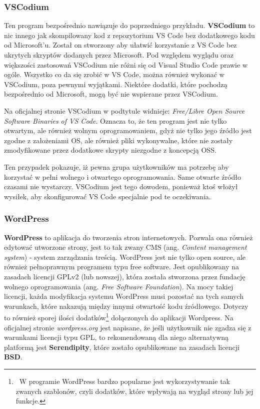 \documentclass{article}
\begin{document}
\subsubsection{VSCodium}

\hspace{4mm} Ten program bezpośrednio nawiązuje do poprzedniego przykładu. \textbf{VSCodium} to nic innego jak skompilowany kod z repozytorium VS Code bez dodatkowego kodu od Microsoft'u. Został on stworzony aby ułatwić korzystanie z VS Code bez ukrytych skryptów dodanych przez Microsoft. Pod względem wyglądu oraz większości zastosowań VSCodium nie różni się od Visual Studio Code prawie w ogóle. Wszystko co da się zrobić w VS Code, można również wykonać w VSCodium, poza pewnymi wyjątkami. Niektóre dodatki, które pochodzą bezpośrednio od Microsoft, mogą być nie wspierane przez VSCodium\cite{vscodium.article}. 

Na oficjalnej stronie VSCodium w podtytule widnieje: \emph{Free/Libre Open Source Software Binaries of VS Code}. Oznacza to, że ten program jest nie tylko otwartym, ale również wolnym oprogramowaniem, gdyż nie tylko jego źródło jest zgodne z założeniami OS, ale również pliki wykonywalne, które nie zostały zmodyfikowane przez dodatkowe skrypty niezgodne z koncepcją OSS\cite{vscodium.website}.

Ten przypadek pokazuje, iż pewna grupa użytkowników ma potrzebę aby korzystać w pełni wolnego i otwartego oprogramowania. Same otwarte źródło czasami nie wystarczy. VSCodium jest tego dowodem, ponieważ ktoś włożył wysiłek, aby skonfigurować VS Code specjalnie pod te oczekiwania.

\subsubsection{WordPress}

\hspace{4mm} \textbf{WordPress} to aplikacja do tworzenia stron internetowych. Pozwala ona również edytować utworzone strony, jest to tak zwany CMS (ang. \emph{Content management system}) - system zarządzania treścią. WordPress jest nie tylko open source, ale również pełnoprawnym programem typu free software. Jest opublikowany na zasadach licencji GPLv2 (lub nowszej), która została stworzona przez fundację wolnego oprogramowania (ang. \emph{Free Software Foundation})\cite{wordpress.license}. Na mocy takiej licencji, każda modyfikacja systemu WordPress musi pozostać na tych samych warunkach, które nakazują między innymi otwartość kodu źródłowego. Dotyczy to również sporej ilości dodatków\footnote{\, W programie WordPress bardzo popularne jest wykorzystywanie tak zwanych szablonów, czyli dodatków, które wpływają na wygląd strony lub jej funkcje.} dołączonych do aplikacji Wordpress. Na oficjalnej stronie \emph{wordpress.org} jest napisane, że jeśli użytkownik nie zgadza się z warunkami licencji typu GPL, to rekomendowaną dla niego alternatywną platformą jest \textbf{Serendipity}, które zostało opublikowane na zasadach licencji \textbf{BSD}\cite{wordpress.license}.
\end{document}
